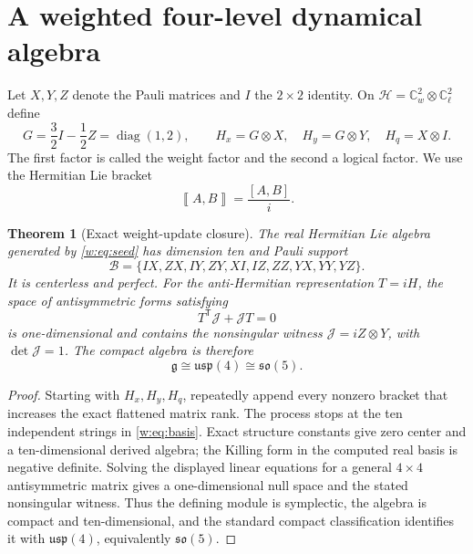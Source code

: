 \documentclass[11pt]{article}
\newtheorem{theorem}{Theorem}[section]
\theoremstyle{remark}\newtheorem{remark}[theorem]{Remark}
\newcommand{\Hbr}[2]{\left\llbracket #1,#2\right\rrbracket}
\begin{document}
\section{A weighted four-level dynamical algebra}

Let $X,Y,Z$ denote the Pauli matrices and $I$ the $2\times2$ identity.  On
$\mathcal H=\mathbb C^2_{w}\otimes\mathbb C^2_{\ell}$ define
\begin{equation}
G=\frac32 I-\frac12 Z=\operatorname{diag}(1,2),\qquad
H_x=G\otimes X,\quad H_y=G\otimes Y,\quad H_q=X\otimes I .
\label{w:eq:seed}
\end{equation}
The first factor is called the weight factor and the second a logical factor.  We use the Hermitian Lie bracket
\begin{equation}
\Hbr{A}{B}=\frac{[A,B]}{i}.
\end{equation}

\begin{theorem}[Exact weight-update closure]\label{w:thm:closure}
The real Hermitian Lie algebra generated by \eqref{w:eq:seed} has dimension ten and Pauli support
\begin{equation}
\mathcal B=\{IX,ZX,IY,ZY,XI,IZ,ZZ,YX,YY,YZ\}.
\label{w:eq:basis}
\end{equation}
It is centerless and perfect.  For the anti-Hermitian representation $T=iH$, the space of antisymmetric forms satisfying
\begin{equation}
T^{\mathsf T}\mathcal J+\mathcal JT=0
\end{equation}
is one-dimensional and contains the nonsingular witness
$\mathcal J=iZ\otimes Y$, with $\det\mathcal J=1$.  The compact algebra is therefore
\begin{equation}
\mathfrak g\cong\mathfrak{usp}(4)\cong\mathfrak{so}(5).
\end{equation}
\end{theorem}

\begin{proof}
Starting with $H_x,H_y,H_q$, repeatedly append every nonzero bracket that increases the exact flattened matrix rank.  The process stops at the ten independent strings in \eqref{w:eq:basis}.  Exact structure constants give zero center and a ten-dimensional derived algebra; the Killing form in the computed real basis is negative definite.  Solving the displayed linear equations for a general $4\times4$ antisymmetric matrix gives a one-dimensional null space and the stated nonsingular witness.  Thus the defining module is symplectic, the algebra is compact and ten-dimensional, and the standard compact classification identifies it with $\mathfrak{usp}(4)$, equivalently $\mathfrak{so}(5)$.
\end{proof}
\end{document}
